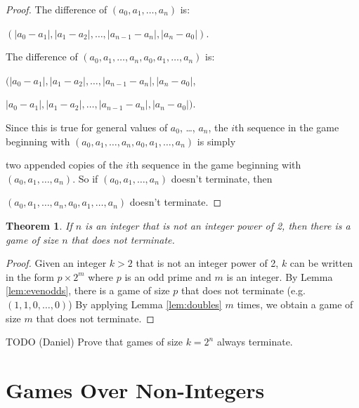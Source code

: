 \documentclass[12pt]{amsart}
\newtheorem{theorem}{Theorem}[section]
\begin{document}
\begin{proof}

The difference of $(a_0, a_1, \ldots, a_{n})$ is:

\noindent
 $(|a_0 - a_1|, |a_1 - a_2|, \ldots, |a_{n-1} - a_n|, |a_n - a_0|)$.

\vspace{.2cm}

The difference of $(a_0, a_1, \ldots, a_{n}, a_0, a_1, \ldots, a_n)$ is:

\noindent
$(|a_0 - a_1|, |a_1 - a_2|, \ldots, |a_{n-1} - a_n|, |a_n - a_0|$,

\noindent
$|a_0 - a_1|, |a_1 - a_2|, \ldots, |a_{n-1} - a_n|, |a_n - a_0|)$.

Since this is true for general values of $a_0$, \ldots, $a_n$, the $i$th sequence in the game beginning with $(a_0, a_1, \ldots, a_{n}, a_0, a_1, \ldots, a_n)$ is simply

\noindent
two appended copies of the $i$th sequence in the game beginning with $(a_0, a_1, \ldots, a_{n})$. So if $(a_0, a_1, \ldots, a_{n})$ doesn't terminate, then 

\noindent
$(a_0, a_1, \ldots, a_{n}, a_0, a_1, \ldots, a_{n})$ doesn't terminate.

\end{proof}

\begin{theorem}
\label{theorem:notPowersOfTwo}
If $n$ is an integer that is not an integer power of 2, then there is a game of size $n$ that does not terminate.
\end{theorem}

\begin{proof}

Given an integer $k > 2$ that is not an integer power of 2, $k$ can be written in the form $p \times 2^{m}$ where $p$ is an odd prime and $m$ is an integer. By Lemma \ref{lem:evenodds}, there is a game of size $p$ that does not terminate (e.g. $(1,1,0, \ldots, 0)$) By applying Lemma \ref{lem:doubles} $m$ times, we obtain a game of size $m$ that does not terminate. 
\end{proof}

TODO (Daniel) Prove that games of size $k = 2^n$ always terminate.



\section{Games Over Non-Integers}
\end{document}

